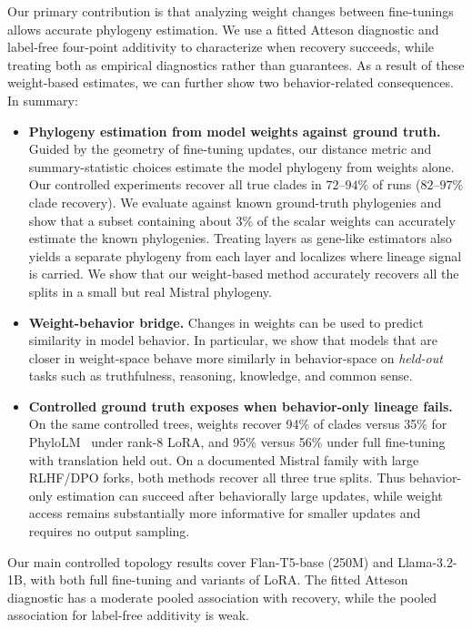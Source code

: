 \documentclass{article}
\theoremstyle{definition}
\theoremstyle{plain}
\begin{document}
Our primary contribution is that analyzing weight changes between fine-tunings allows accurate phylogeny estimation. We use a fitted Atteson diagnostic and label-free four-point additivity to characterize when recovery succeeds, while treating both as empirical diagnostics rather than guarantees. As a result of these weight-based estimates, we can further show two behavior-related consequences. In summary:
\begin{itemize}[leftmargin=1.3em,itemsep=1pt,topsep=2pt,parsep=0pt]
  \item \textbf{Phylogeny estimation from model weights against ground truth.} Guided by the geometry of
    fine-tuning updates, our distance metric and summary-statistic choices estimate the model phylogeny from
    weights alone. Our controlled experiments recover all true clades in $72$--$94\%$ of runs
    ($82$--$97\%$ clade recovery). We evaluate against known ground-truth phylogenies and show that a subset containing about 3\% of the scalar weights can accurately estimate the known phylogenies. Treating layers as gene-like estimators also yields a separate phylogeny from each layer and localizes where lineage signal is carried. We show that our weight-based method accurately recovers all the splits in a small but real Mistral phylogeny.
  \item \textbf{Weight-behavior bridge.} Changes in weights can be used to predict similarity in model behavior.  In particular, we show that models that are closer in weight-space behave more similarly in behavior-space on \textit{held-out} tasks such as truthfulness, reasoning, knowledge, and common sense.
  \item \textbf{Controlled ground truth exposes when behavior-only lineage fails.}
    On the same controlled trees, weights recover 94\% of clades versus 35\% for
    PhyloLM~\citep{yax2025phylolm} under rank-8 LoRA, and 95\% versus 56\% under full fine-tuning
    with translation held out. On a documented Mistral family with large RLHF/DPO forks, both methods
    recover all three true splits. Thus behavior-only estimation can succeed after behaviorally large
    updates, while weight access remains substantially more informative for smaller updates and
    requires no output sampling.
\end{itemize}
Our main controlled topology results cover Flan-T5-base (250M) and Llama-3.2-1B, with both full
fine-tuning and variants of LoRA. The fitted Atteson diagnostic has a moderate pooled association with
recovery, while the pooled association for label-free additivity is weak.
\end{document}
